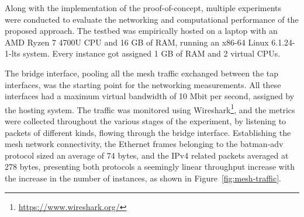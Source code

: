 Along with the implementation of the proof-of-concept, multiple experiments were conducted to evaluate the networking and computational performance of the proposed approach. The testbed was empirically hosted on a laptop with an AMD Ryzen 7 4700U CPU and 16 GB of RAM, running an x86-64 Linux 6.1.24-1-lts system. Every instance got assigned 1 GB of RAM and 2 virtual CPUs. 

The bridge interface, pooling all the mesh traffic exchanged between the tap interfaces, was the starting point for the networking measurements. All these interfaces had a maximum virtual bandwidth of 10 Mbit per second, assigned by the hosting system. The traffic was monitored using Wireshark\footnote{\url{https://www.wireshark.org/}}, and the metrics were collected throughout the various stages of the experiment, by listening to packets of different kinds, flowing through the bridge interface. Establishing the mesh network connectivity, the Ethernet frames belonging to the batman-adv protocol sized an average of 74 bytes, and the IPv4 related packets averaged at 278 bytes, presenting both protocols a seemingly linear throughput increase with the increase in the number of instances, as shown in Figure~\ref{fig:mesh-traffic}. 

